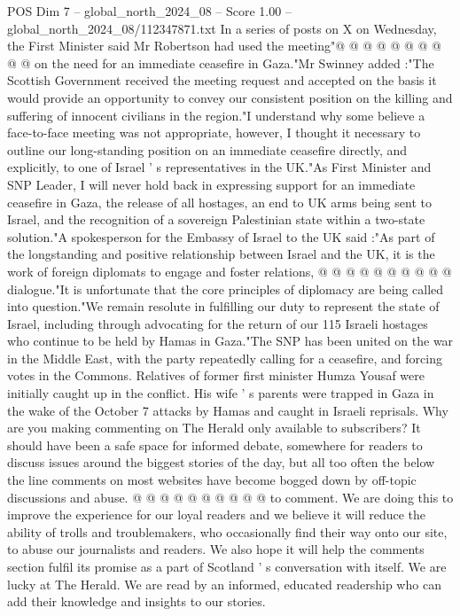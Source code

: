 \begin{textsample}{POS Dim 7 – global\_north\_2024\_08 – Score 1.00 – global\_north\_2024\_08/112347871.txt}
In a series of posts on X on Wednesday, the First Minister said Mr Robertson had used the meeting"@ @ @ @ @ @ @ @ @ @ on the need for an immediate ceasefire in Gaza."Mr Swinney added :"The Scottish Government received the meeting request and accepted on the basis it would provide an opportunity to convey our consistent position on the killing and suffering of innocent civilians in the region."I understand why some believe a face-to-face meeting was not appropriate, however, I thought it necessary to outline our long-standing position on an immediate ceasefire directly, and explicitly, to one of Israel ' s representatives in the UK."As First Minister and SNP Leader, I will never hold back in expressing support for an immediate ceasefire in Gaza, the release of all hostages, an end to UK arms being sent to Israel, and the recognition of a sovereign Palestinian state within a two-state solution."A spokesperson for the Embassy of Israel to the UK said :"As part of the longstanding and positive relationship between Israel and the UK, it is the work of foreign diplomats to engage and foster relations, @ @ @ @ @ @ @ @ @ @ dialogue."It is unfortunate that the core principles of diplomacy are being called into question."We remain resolute in fulfilling our duty to represent the state of Israel, including through advocating for the return of our 115 Israeli hostages who continue to be held by Hamas in Gaza."The SNP has been united on the war in the Middle East, with the party repeatedly calling for a ceasefire, and forcing votes in the Commons.
Relatives of former first minister Humza Yousaf were initially caught up in the conflict.
His wife ' s parents were trapped in Gaza in the wake of the October 7 attacks by Hamas and caught in Israeli reprisals.
Why are you making commenting on The Herald only available to subscribers?
It should have been a safe space for informed debate, somewhere for readers to discuss issues around the biggest stories of the day, but all too often the below the line comments on most websites have become bogged down by off-topic discussions and abuse. @ @ @ @ @ @ @ @ @ @ to comment.
We are doing this to improve the experience for our loyal readers and we believe it will reduce the ability of trolls and troublemakers, who occasionally find their way onto our site, to abuse our journalists and readers.
We also hope it will help the comments section fulfil its promise as a part of Scotland ' s conversation with itself.
We are lucky at The Herald.
We are read by an informed, educated readership who can add their knowledge and insights to our stories.

\end{textsample}
